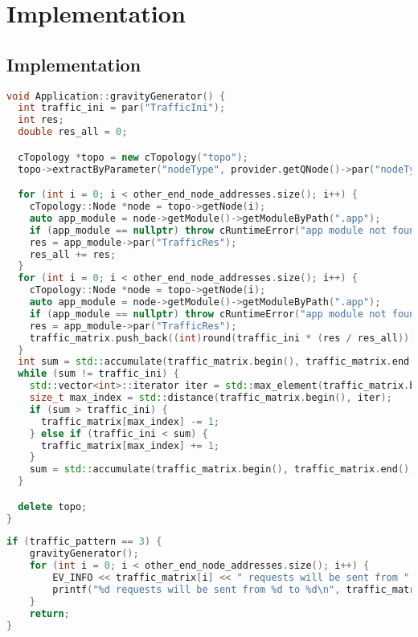 \chapter{Implementation}
\label{implementation}

\section{Implementation}

\begin{lstlisting}[language=c++,caption=Gravity Generator Function]
void Application::gravityGenerator() {
  int traffic_ini = par("TrafficIni");
  int res;
  double res_all = 0;

  cTopology *topo = new cTopology("topo");
  topo->extractByParameter("nodeType", provider.getQNode()->par("nodeType").str().c_str());

  for (int i = 0; i < other_end_node_addresses.size(); i++) {
    cTopology::Node *node = topo->getNode(i);
    auto app_module = node->getModule()->getModuleByPath(".app");
    if (app_module == nullptr) throw cRuntimeError("app module not found");
    res = app_module->par("TrafficRes");
    res_all += res;
  }
  for (int i = 0; i < other_end_node_addresses.size(); i++) {
    cTopology::Node *node = topo->getNode(i);
    auto app_module = node->getModule()->getModuleByPath(".app");
    if (app_module == nullptr) throw cRuntimeError("app module not found");
    res = app_module->par("TrafficRes");
    traffic_matrix.push_back((int)round(traffic_ini * (res / res_all)));
  }
  int sum = std::accumulate(traffic_matrix.begin(), traffic_matrix.end(), 0);
  while (sum != traffic_ini) {
    std::vector<int>::iterator iter = std::max_element(traffic_matrix.begin(), traffic_matrix.end());
    size_t max_index = std::distance(traffic_matrix.begin(), iter);
    if (sum > traffic_ini) {
      traffic_matrix[max_index] -= 1;
    } else if (traffic_ini < sum) {
      traffic_matrix[max_index] += 1;
    }
    sum = std::accumulate(traffic_matrix.begin(), traffic_matrix.end(), 0);
  }

  delete topo;
}
\end{lstlisting}

\begin{lstlisting}[language=c++,caption=inside of initialize function]
if (traffic_pattern == 3) {
    gravityGenerator();
    for (int i = 0; i < other_end_node_addresses.size(); i++) {
        EV_INFO << traffic_matrix[i] << " requests will be sent from " << my_address << " to " << other_end_node_addresses[i] << "\n";
        printf("%d requests will be sent from %d to %d\n", traffic_matrix[i], my_address, other_end_node_addresses[i]);
    }
    return;
}
\end{lstlisting}



